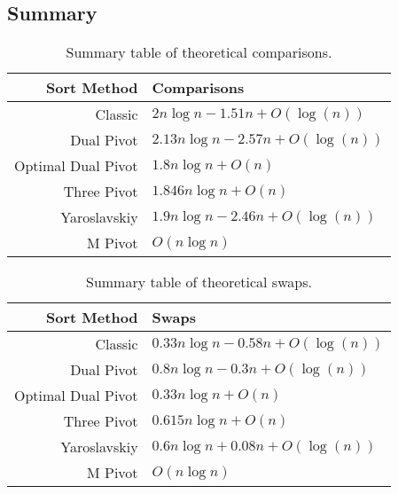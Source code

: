 	\subsection{Summary}
		\begin{table}
			\begin{center}
				\begin{tabular}{|r|l|}
					\hline
					Sort Method        &   Comparisons                          \\ \hline \hline
					Classic            &   $2n \log n - 1.51n  + O(\log(n))$   \\ \hline
					Dual Pivot         &   $2.13n \log n - 2.57n + O(\log(n))$ \\ \hline
					Optimal Dual Pivot &   $1.8n \log n + O(n)$               \\ \hline
					Three Pivot        &   $1.846n \log n + O(n)$             \\ \hline
					Yaroslavskiy       &   $1.9n \log n - 2.46n + O(\log(n))$  \\ \hline
					M Pivot            &   $O(n \log n)$                        \\ 
					\hline
				\end{tabular}
				\caption{Summary table of theoretical comparisons.}
				\label{tab:CompSummary}
			\end{center}
		\end{table}

		\begin{table}
			\begin{center}
				\begin{tabular}{|r|l|}
					\hline
					Sort Method         &     Swaps \\ \hline \hline
					Classic             &  $0.33n \log n - 0.58n + O(\log(n))$\\ \hline
					Dual Pivot          &  $0.8n \log n -0.3n + O(\log(n))$   \\ \hline
					Optimal Dual Pivot  &  $0.33n \log n + O(n)$              \\ \hline
					Three Pivot         &  $0.615n \log n + O(n)$             \\ \hline
					Yaroslavskiy        &  $0.6n \log n + 0.08n + O(\log(n))$  \\ \hline
					M Pivot             &  $O(n \log n)$ \\ 
					\hline
				\end{tabular}
				\caption{Summary table of theoretical swaps.}
				\label{tab:SwapSummary}
			\end{center}
		\end{table}